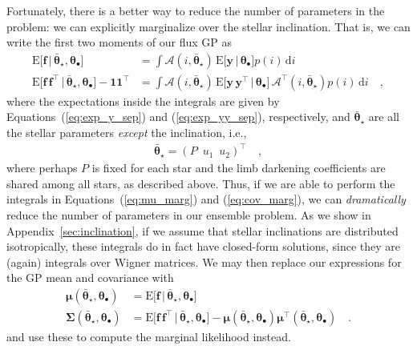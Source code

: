 \documentclass[modern]{aastex62}
\begin{document}
Fortunately, there is a better way to reduce the number of parameters in
the problem: we can explicitly marginalize over the stellar inclination.
That is, we can write the first two moments of our flux GP as
%
\begin{align}
    \label{eq:mu_marg}
    \mathrm{E} \Big[ \mathbf{f} \, \Big| \, \bar{\pmb{\theta}}_\star, \pmb{\theta}_\bullet \Big]
     & =
    \int
    \pmb{\mathcal{A}}(i, \bar{\pmb{\theta}}_\star) \,
    \mathrm{E} \Big[ \mathbf{y} \, \Big| \, \pmb{\theta}_\bullet \Big]
    p(i) \, \mathrm{d}i \\
    \label{eq:cov_marg}
    \mathrm{E} \Big[ \mathbf{f} \, \mathbf{f}^\top \, \Big| \, \bar{\pmb{\theta}}_\star, \pmb{\theta}_\bullet \Big]
    - \mathbf{1} \mathbf{1}^\top
     & =
    \int
    \pmb{\mathcal{A}}(i, \bar{\pmb{\theta}}_\star) \,
    \mathrm{E} \Big[ \mathbf{y} \, \mathbf{y}^\top \, \Big| \, \pmb{\theta}_\bullet \Big] \,
    \pmb{\mathcal{A}}^\top(i, \bar{\pmb{\theta}}_\star)
    p(i) \, \mathrm{d}i
    \quad,
\end{align}
%
where the expectations inside the integrals are given by
Equations~(\ref{eq:exp_y_sep}) and (\ref{eq:exp_yy_sep}), respectively, and
$\bar{\pmb{\theta}}_\star$ are all the stellar parameters \emph{except}
the inclination, i.e.,
%
\begin{align}
    \bar{\pmb{\theta}}_\star = \left(
    P \,\,\,
    u_1 \,\,\,
    u_2
    \right)^\top
    \quad,
\end{align}
%
where perhaps $P$ is fixed for each star and the limb darkening coefficients
are shared among all stars, as described above.
%
Thus, if we are able to perform the integrals in Equations~(\ref{eq:mu_marg})
and (\ref{eq:cov_marg}), we can \emph{dramatically} reduce the number of
parameters in our ensemble problem.
%
As we show in Appendix~\ref{sec:inclination}, if we assume that stellar
inclinations are distributed isotropically, these integrals
do in fact have closed-form solutions,
since they are (again) integrals over Wigner matrices.
%
We may then replace our expressions for the GP mean and covariance with
%
\begin{align}
    \pmb{\mu}(\bar{\pmb{\theta}}_\star, \pmb{\theta}_\bullet)
     & = \mathrm{E} \Big[ \mathbf{f} \, \Big| \, \bar{\pmb{\theta}}_\star, \pmb{\theta}_\bullet \Big]
    \\
    \pmb{\Sigma}(\bar{\pmb{\theta}}_\star, \pmb{\theta}_\bullet)
     & = \mathrm{E} \Big[ \mathbf{f} \, \mathbf{f}^\top \, \Big| \, \bar{\pmb{\theta}}_\star, \pmb{\theta}_\bullet \Big] - \pmb{\mu}(\bar{\pmb{\theta}}_\star, \pmb{\theta}_\bullet) \pmb{\mu}^\top(\bar{\pmb{\theta}}_\star, \pmb{\theta}_\bullet)
    \quad.
\end{align}
%
and use these to compute the marginal likelihood instead.
\end{document}
